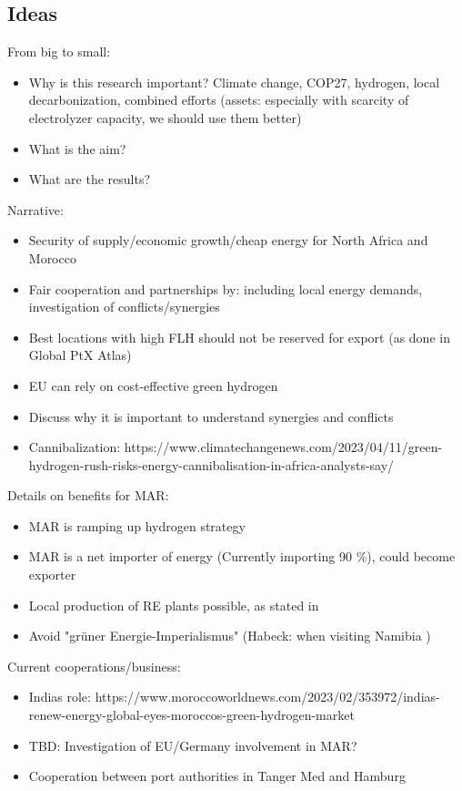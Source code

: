 
\subsection{Ideas}
From big to small:
\begin{itemize}
    \item Why is this research important? Climate change, COP27, hydrogen, local decarbonization, combined efforts (assets: especially with scarcity of electrolyzer capacity, we should use them better)
    \item What is the aim?
    \item What are the results?
\end{itemize}

Narrative: 
\begin{itemize}
    \item Security of supply/economic growth/cheap energy for North Africa and Morocco
    \item Fair cooperation and partnerships by: including local energy demands, investigation of conflicts/synergies
    \item Best locations with high FLH should not be reserved for export (as done in Global PtX Atlas)
    \item EU can rely on cost-effective green hydrogen
    \item Discuss why it is important to understand synergies and conflicts
    \item Cannibalization: https://www.climatechangenews.com/2023/04/11/green-hydrogen-rush-risks-energy-cannibalisation-in-africa-analysts-say/
\end{itemize}

Details on benefits for MAR:
\begin{itemize}
    \item MAR is ramping up hydrogen strategy
    \item MAR is a net importer of energy (Currently importing 90 \%), could become exporter
    \item Local production of RE plants possible, as stated in \cite{Ersoy2022}
    \item Avoid "gr{\"u}ner Energie-Imperialismus" (Habeck: when visiting Namibia ) \cite{HabeckEnergieimperialismus}
\end{itemize}

Current cooperations/business:
\begin{itemize}
    \item Indias role: https://www.moroccoworldnews.com/2023/02/353972/indias-renew-energy-global-eyes-moroccos-green-hydrogen-market
    \item TBD: Investigation of EU/Germany involvement in MAR?
    \item Cooperation between port authorities in Tanger Med and Hamburg
\end{itemize}

